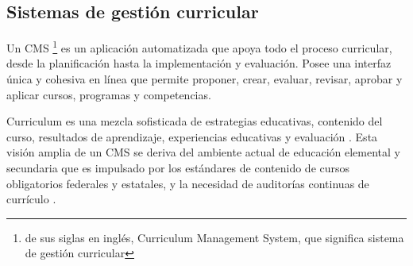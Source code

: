 


\subsection{Sistemas de gestión curricular}
Un CMS \footnote{de sus siglas en inglés, Curriculum Management System, que significa sistema de gestión curricular} es un aplicación automatizada que apoya todo el proceso curricular, desde la planificación hasta la implementación y evaluación. Posee una interfaz única y cohesiva en línea que permite proponer, crear, evaluar, revisar, aprobar y aplicar cursos, programas y competencias.

Curriculum es una mezcla sofisticada de estrategias educativas, contenido del curso, resultados de aprendizaje, experiencias educativas y evaluación \citep{harden2001amee}. Esta visión amplia de un CMS se deriva del ambiente actual de educación elemental y secundaria que es impulsado por los estándares de contenido de cursos obligatorios federales y estatales, y la necesidad de auditorías continuas de currículo \citep{west2000technology}.

